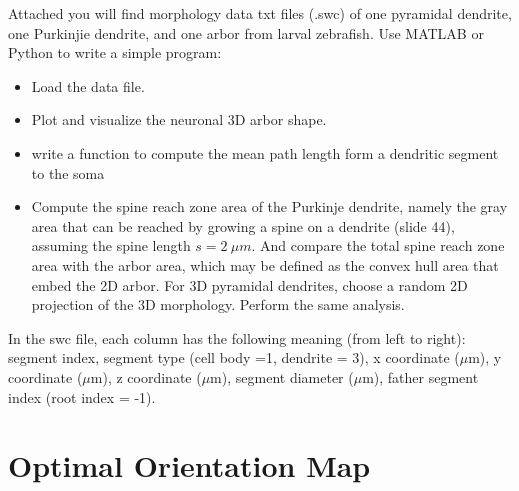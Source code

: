 \documentclass{article}
\begin{document}
Attached you will find morphology data txt files (.swc) of one pyramidal dendrite, one Purkinjie dendrite, and one arbor from larval zebrafish. Use MATLAB or Python to write a simple program: 
\begin{itemize}
\item Load the data file. 
\item Plot and visualize the neuronal 3D arbor shape. 
\item write a function to compute the mean path length form a dendritic segment to the soma
\item Compute the spine reach zone area of the Purkinje dendrite, namely the gray area that can be reached by growing a spine on a dendrite (slide 44), assuming the spine length $s = 2 ~\mu m$. And compare the total spine reach zone area with the arbor area, which may be defined as the convex hull area that embed the 2D arbor. For 3D pyramidal dendrites, choose a random 2D projection of the 3D morphology. Perform the same analysis. 
\end{itemize}
In the swc file, each column has the following meaning (from left to right): segment index, segment type (cell body =1, dendrite = 3), x coordinate ($\mu$m), y coordinate ($\mu$m), z coordinate ($\mu$m), segment diameter ($\mu$m), father segment index (root index = -1). 


\section*{Optimal Orientation Map}
\end{document}

